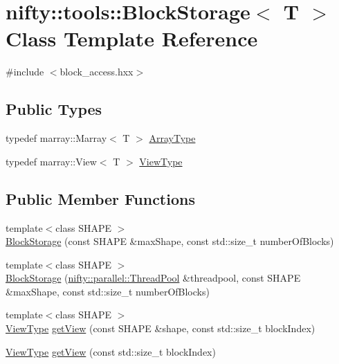 \hypertarget{classnifty_1_1tools_1_1BlockStorage}{}\section{nifty\+:\+:tools\+:\+:Block\+Storage$<$ T $>$ Class Template Reference}
\label{classnifty_1_1tools_1_1BlockStorage}


{\ttfamily \#include $<$block\+\_\+access.\+hxx$>$}

\subsection*{Public Types}
\begin{DoxyCompactItemize}
\item 
typedef marray\+::\+Marray$<$ T $>$ \hyperlink{classnifty_1_1tools_1_1BlockStorage_aadae8d95280c9262f19ea9237a0c3f9b}{Array\+Type}
\item 
typedef marray\+::\+View$<$ T $>$ \hyperlink{classnifty_1_1tools_1_1BlockStorage_a9dd09d47fecd6aedc1c9bd84e526e84e}{View\+Type}
\end{DoxyCompactItemize}
\subsection*{Public Member Functions}
\begin{DoxyCompactItemize}
\item 
{\footnotesize template$<$class S\+H\+A\+P\+E $>$ }\\\hyperlink{classnifty_1_1tools_1_1BlockStorage_a95d95c49b1a1ed51c6d794d3fe8f2645}{Block\+Storage} (const S\+H\+A\+P\+E \&max\+Shape, const std\+::size\+\_\+t number\+Of\+Blocks)
\item 
{\footnotesize template$<$class S\+H\+A\+P\+E $>$ }\\\hyperlink{classnifty_1_1tools_1_1BlockStorage_a536abc42caab3d50becdfbadd2d58f89}{Block\+Storage} (\hyperlink{classnifty_1_1parallel_1_1ThreadPool}{nifty\+::parallel\+::\+Thread\+Pool} \&threadpool, const S\+H\+A\+P\+E \&max\+Shape, const std\+::size\+\_\+t number\+Of\+Blocks)
\item 
{\footnotesize template$<$class S\+H\+A\+P\+E $>$ }\\\hyperlink{classnifty_1_1tools_1_1BlockStorage_a9dd09d47fecd6aedc1c9bd84e526e84e}{View\+Type} \hyperlink{classnifty_1_1tools_1_1BlockStorage_ae9f1e8b14c9281036350c8e6022c5ec0}{get\+View} (const S\+H\+A\+P\+E \&shape, const std\+::size\+\_\+t block\+Index)
\item 
\hyperlink{classnifty_1_1tools_1_1BlockStorage_a9dd09d47fecd6aedc1c9bd84e526e84e}{View\+Type} \hyperlink{classnifty_1_1tools_1_1BlockStorage_a03263a4946397ebea215101c8e53bc24}{get\+View} (const std\+::size\+\_\+t block\+Index)
\end{DoxyCompactItemize}


